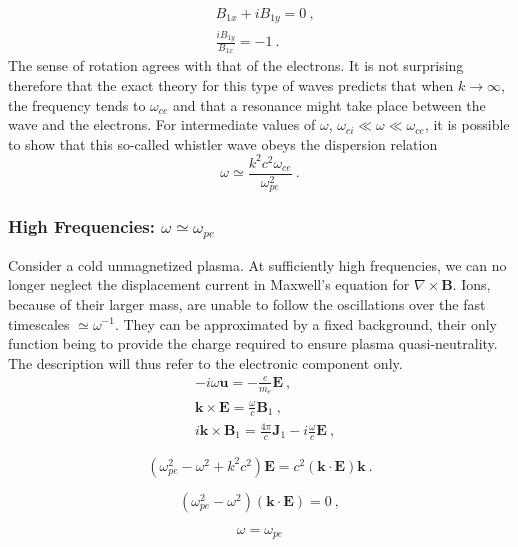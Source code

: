 \documentclass[12pt,a4paper]{article}
\renewcommand{\vec}[1]{\boldsymbol{#1}}
\begin{document}
\begin{align*}
& B_{1x} +iB_{1y} = 0 ~, \\
& \frac{i B_{1y}}{B_{1x} } = -1 ~.
\end{align*}
The sense of rotation agrees with that of the electrons. It is not surprising therefore that the exact theory for this type of waves predicts that when $k \rightarrow \infty$, the frequency tends to $\omega_{ce}$ and that a resonance might take place between the wave and the electrons. For intermediate values of $\omega$, $\omega_{ci} \ll \omega \ll \omega_{ce}$, it is possible to show that this so-called whistler wave obeys the dispersion relation
\begin{equation*}
\omega \simeq \frac{k^2 c^2 \omega_{ce}}{\omega_{pe}^2} ~.
\end{equation*}





\subsubsection{High Frequencies: $\omega \simeq \omega_{pe}$}
Consider a cold unmagnetized plasma. At sufficiently high frequencies, we can no longer neglect the displacement current in Maxwell's equation for $\nabla \times \vec{B}$. Ions, because of their larger mass, are unable to follow the oscillations over the fast timescales $\simeq \omega^{-1}$. They can be approximated by a fixed background, their only function being to provide the charge required to ensure plasma quasi-neutrality. The description will thus refer to the electronic component only.
\begin{align}
& -i\omega \vec{u} = - \frac{e}{m_e} \vec{E} ~, \\
& \vec{k} \times \vec{E} = \frac{\omega}{c} \vec{B}_1 ~, \\
& i \vec{k} \times \vec{B}_1 = \frac{4\pi}{c} \vec{J}_1 - i\frac{\omega}{c} \vec{E} ~,
\end{align}

\begin{equation}
(\omega_{pe}^2 -\omega^2 +k^2 c^2) \vec{E} = c^2 (\vec{k} \cdot \vec{E}) \vec{k} ~.
\end{equation}

\begin{equation*}
(\omega_{pe}^2 -\omega^2) (\vec{k} \cdot \vec{E}) = 0 ~,
\end{equation*}

\begin{equation*}
\omega = \omega_{pe}
\end{equation*}
\end{document}
